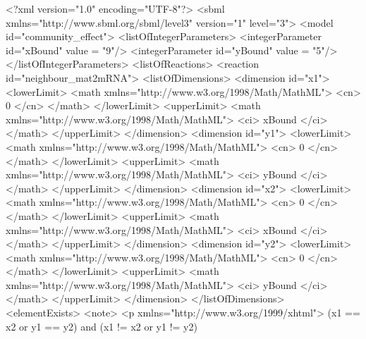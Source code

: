 \documentclass{cekarticle}
\begin{document}
\begin{example}
<?xml version="1.0" encoding="UTF-8"?>
<sbml xmlns="http://www.sbml.org/sbml/level3" version="1" level="3">
<model id="community_effect">
    <listOfIntegerParameters>
        <integerParameter id="xBound" value = "9"/>
        <integerParameter id="yBound" value = "5"/>
    </listOfIntegerParameters>
    <listOfReactions>
        <reaction id="neighbour_mat2mRNA">
            <listOfDimensions>
                <dimension id="x1">
                    <lowerLimit>
                        <math xmlns="http://www.w3.org/1998/Math/MathML">
                            <cn> 0 </cn>
                        </math>
                    </lowerLimit>
                    <upperLimit>
                        <math xmlns="http://www.w3.org/1998/Math/MathML">
                            <ci> xBound </ci>
                        </math>
                    </upperLimit>
                </dimension>
                <dimension id="y1">
                    <lowerLimit>
                        <math xmlns="http://www.w3.org/1998/Math/MathML">
                            <cn> 0 </cn>
                        </math>
                    </lowerLimit>
                    <upperLimit>
                        <math xmlns="http://www.w3.org/1998/Math/MathML">
                            <ci> yBound </ci>
                        </math>
                    </upperLimit>
                </dimension>
                <dimension id="x2">
                    <lowerLimit>
                        <math xmlns="http://www.w3.org/1998/Math/MathML">
                            <cn> 0 </cn>
                        </math>
                    </lowerLimit>
                    <upperLimit>
                        <math xmlns="http://www.w3.org/1998/Math/MathML">
                            <ci> xBound </ci>
                        </math>
                    </upperLimit>
                </dimension>
                <dimension id="y2">
                    <lowerLimit>
                        <math xmlns="http://www.w3.org/1998/Math/MathML">
                            <cn> 0 </cn>
                        </math>
                    </lowerLimit>
                    <upperLimit>
                        <math xmlns="http://www.w3.org/1998/Math/MathML">
                            <ci> yBound </ci>
                        </math>
                    </upperLimit>
                </dimension>
            </listOfDimensions>
            <elementExists>
                <note>
                    <p xmlns="http://www.w3.org/1999/xhtml">
                        (x1 == x2 or y1 == y2) and (x1 != x2 or y1 != y2)

\end{example}
\end{document}
